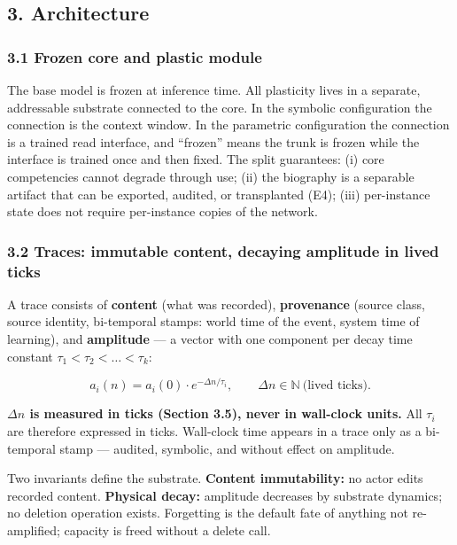 \documentclass[
]{article}
\begin{document}
\subsection{3. Architecture}\label{architecture}

\subsubsection{3.1 Frozen core and plastic
module}\label{frozen-core-and-plastic-module}

The base model is frozen at inference time. All plasticity lives in a
separate, addressable substrate connected to the core. In the symbolic
configuration the connection is the context window. In the parametric
configuration the connection is a trained read interface, and ``frozen''
means the trunk is frozen while the interface is trained once and then
fixed. The split guarantees: (i) core competencies cannot degrade
through use; (ii) the biography is a separable artifact that can be
exported, audited, or transplanted (E4); (iii) per-instance state does
not require per-instance copies of the network.

\subsubsection{3.2 Traces: immutable content, decaying amplitude in
lived
ticks}\label{traces-immutable-content-decaying-amplitude-in-lived-ticks}

A trace consists of \textbf{content} (what was recorded),
\textbf{provenance} (source class, source identity, bi-temporal stamps:
world time of the event, system time of learning), and
\textbf{amplitude} --- a vector with one component per decay time
constant \(\tau_1 < \tau_2 < \dots < \tau_k\):

\[a_i(n) = a_i(0)\cdot e^{-\Delta n/\tau_i}, \qquad \Delta n \in \mathbb{N}\ \text{(lived ticks)}.\]

\textbf{\(\Delta n\) is measured in ticks (Section 3.5), never in
wall-clock units.} All \(\tau_i\) are therefore expressed in ticks.
Wall-clock time appears in a trace only as a bi-temporal stamp ---
audited, symbolic, and without effect on amplitude.

Two invariants define the substrate. \textbf{Content immutability:} no
actor edits recorded content. \textbf{Physical decay:} amplitude
decreases by substrate dynamics; no deletion operation exists.
Forgetting is the default fate of anything not re-amplified; capacity is
freed without a delete call.
\end{document}
